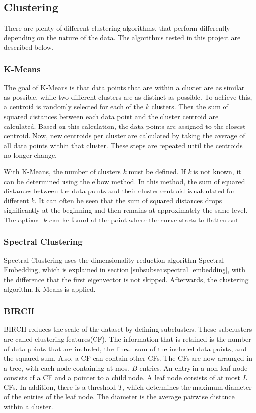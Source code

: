 \subsection{Clustering}
\label{clustering_methods}

There are plenty of different clustering algorithms, that perform differently depending on the nature of the data.
The algorithms tested in this project are described below.

\subsubsection{K-Means}
The goal of K-Means is that data points that are within a cluster are as similar as possible, while two different clusters are as distinct as possible.
To achieve this, a centroid is randomly selected for each of the $k$ clusters.
Then the sum of squared distances between each data point and the cluster centroid are calculated.
Based on this calculation, the data points are assigned to the closest centroid.
Now, new centroids per cluster are calculated by taking the average of all data points within that cluster.
These steps are repeated until the centroids no longer change.\cite{kmeans}

With K-Means, the number of clusters $k$ must be defined. If $k$ is not known, it can be determined using the elbow method.
In this method, the sum of squared distances between the data points and their cluster centroid is calculated for different $k$.
It can often be seen that the sum of squared distances drops significantly at the beginning and then remains at approximately the same level.
The optimal $k$ can be found at the point where the curve starts to flatten out.\cite{kmeans}

\subsubsection{Spectral Clustering}
Spectral Clustering uses the dimensionality reduction algorithm Spectral Embedding, which is explained in section \ref{subsubsec:spectral_embedding}, with the difference that the first eigenvector is not skipped.
Afterwards, the clustering algorithm K-Means is applied.

\subsubsection{BIRCH}
BIRCH reduces the scale of the dataset by defining subclusters.
These subclusters are called clustering features(CF).
The information that is retained is the number of data points that are included, the linear sum of the included data points, and the squared sum.
Also, a CF can contain other CFs.
The CFs are now arranged in a tree, with each node containing at most $B$ entries.
An entry in a non-leaf node consists of a CF and a pointer to a child node.
A leaf node consists of at most $L$ CFs.
In addition, there is a threshold $T$, which determines the maximum diameter of the entries of the leaf node.
The diameter is the average pairwise distance within a cluster.

